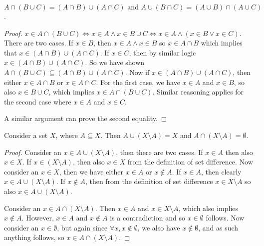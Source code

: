 \documentclass[12pt]{article}
\newenvironment{proposition}[2][Proposition]{\begin{trivlist}
\item[\hskip \labelsep {\bfseries #1}\hskip \labelsep {\bfseries #2}]}{\end{trivlist}}
\begin{document}
\begin{proposition}{3.1.28f}
	$ A \cap (B \cup C) = (A \cap B) \cup (A \cap C) \text{ and } A \cup (B \cap C) = (A \cup B) \cap (A \cup C) $.
\end{proposition}
\begin{proof}
	$ x \in A \cap (B \cup C) \iff x \in A \land x \in B \cup C \iff x \in A \land (x \in B \lor x \in C) $.
	There are two cases.
	If $ x \in B $, then $ x \in A \land x \in B $ so $ x \in A \cap B $ which implies that $ x \in (A \cap B) \cup (A \cap C) $.
	If $ x \in C $, then by similar logic $ x \in (A \cap B) \cup (A \cap C) $.
	So we have shown $ A \cap (B \cup C) \subseteq (A \cap B) \cup (A \cap C) $.
	Now if $ x \in (A \cap B) \cup (A \cap C) $, then either $ x \in A \cap B $ or $ x \in A \cap C $.
	For the first case, we have $ x \in A $ and $ x \in B $, so also $ x \in B \cup C $, which implies $ x \in A \cap (B \cup C) $.
	Similar reasoning applies for the second case where $ x \in A $ and $ x \in C $.
	
	A similar argument can prove the second equality.
\end{proof}

\begin{proposition}{3.1.28g}
	Consider a set $ X $, where $ A \subseteq X $.
	Then $ A \cup (X \setminus A) = X $ and $ A \cap (X \setminus A) = \emptyset $.
\end{proposition}
\begin{proof}
	Consider an $ x \in A \cup (X \setminus A) $, then there are two cases.
	If $ x \in A $ then also $ x \in X $.
	If $ x \in (X \setminus A) $, then also $ x \in X $ from the definition of set difference.
	Now consider an $ x \in X $, then we have either $ x \in A $ or $ x \notin A $.
	If $ x \in A $, then clearly $ x \in A \cup (X \setminus A) $.
	If $ x \notin A $, then from the definition of set difference $ x \in X \setminus A $ so also $ x \in A \cup (X \setminus A) $.
	
	Consider an $ x \in A \cap (X \setminus A) $.
	Then $ x \in A $ and $ x \in X \setminus A $, which also implies $ x \notin A $.
	However, $ x \in A $ and $ x \notin A $ is a contradiction and so $ x \in \emptyset $ follows.
	Now consider an $ x \in \emptyset $, but again since $ \forall x, x \notin \emptyset $, we also have $ x \notin \emptyset $, and as such anything follows, so $ x \in A \cap (X \setminus A) $.
\end{proof}
\end{document}
